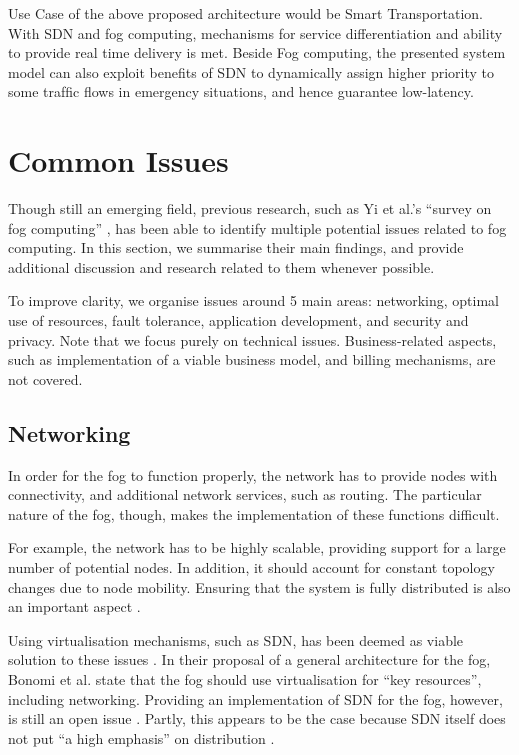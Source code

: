 \documentclass{article}
\begin{document}
Use Case of the above proposed architecture would be 
Smart Transportation. With SDN and fog computing, mechanisms for service differentiation and ability to provide real time delivery is met. Beside Fog computing, the presented system model can also exploit beneﬁts of SDN to dynamically assign higher priority to some trafﬁc ﬂows in emergency situations, and hence guarantee low-latency. 


\pagebreak

\section{Common Issues}

Though still an emerging field, previous research, such as Yi et al.'s ``survey on fog computing'' \cite{yi2015survey}, has been able to identify multiple potential issues related to fog computing. In this section, we summarise their main findings, and provide additional discussion and research related to them whenever possible.

To improve clarity, we organise issues around 5 main areas: networking, optimal use of resources, fault tolerance, application development, and security and privacy. Note that we focus purely on technical issues. Business-related aspects, such as implementation of a viable business model, and billing mechanisms, are not covered.

\subsection{Networking}
In order for the fog to function properly, the network has to provide nodes with connectivity, and additional network services, such as routing. The particular nature of the fog, though, makes the implementation of these functions difficult. 

For example, the network has to be highly scalable, providing support for a large number of potential nodes. In addition, it should account for constant topology changes due to node mobility. Ensuring that the system is fully distributed is also an important aspect \cite{yi2015survey}.

Using virtualisation mechanisms, such as SDN, has been deemed as viable solution to these issues \cite{yi2015survey}. In their proposal of a general architecture for the fog, Bonomi et al. \cite{bonomi2014fog} state that the fog should use virtualisation for ``key resources'', including networking. Providing an implementation of SDN for the fog, however, is still an open issue \cite{yi2015survey}. Partly, this appears to be the case because SDN itself does not put ``a high emphasis'' on distribution \cite{peng2016fog}.
\end{document}
